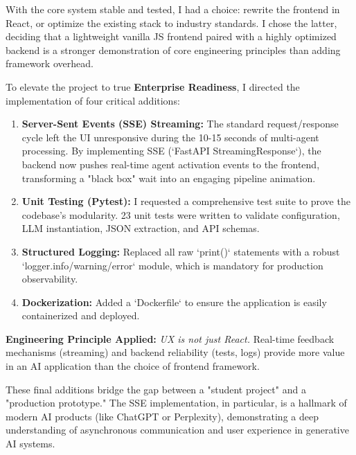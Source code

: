 \documentclass[12pt, a4paper]{article}
\begin{document}
\begin{reasonbox}
With the core system stable and tested, I had a choice: rewrite the frontend in React, or optimize the existing stack to industry standards. I chose the latter, deciding that a lightweight vanilla JS frontend paired with a highly optimized backend is a stronger demonstration of core engineering principles than adding framework overhead.

To elevate the project to true \textbf{Enterprise Readiness}, I directed the implementation of four critical additions:
\begin{enumerate}[leftmargin=1.5em]
    \item \textbf{Server-Sent Events (SSE) Streaming:} The standard request/response cycle left the UI unresponsive during the 10-15 seconds of multi-agent processing. By implementing SSE (`FastAPI StreamingResponse`), the backend now pushes real-time agent activation events to the frontend, transforming a "black box" wait into an engaging pipeline animation.
    \item \textbf{Unit Testing (Pytest):} I requested a comprehensive test suite to prove the codebase's modularity. 23 unit tests were written to validate configuration, LLM instantiation, JSON extraction, and API schemas. 
    \item \textbf{Structured Logging:} Replaced all raw `print()` statements with a robust `logger.info/warning/error` module, which is mandatory for production observability.
    \item \textbf{Dockerization:} Added a `Dockerfile` to ensure the application is easily containerized and deployed.
\end{enumerate}

\textbf{Engineering Principle Applied:} \textit{UX is not just React.} Real-time feedback mechanisms (streaming) and backend reliability (tests, logs) provide more value in an AI application than the choice of frontend framework.
\end{reasonbox}

\begin{impactbox}
These final additions bridge the gap between a "student project" and a "production prototype." The SSE implementation, in particular, is a hallmark of modern AI products (like ChatGPT or Perplexity), demonstrating a deep understanding of asynchronous communication and user experience in generative AI systems.
\end{impactbox}

\end{document}
